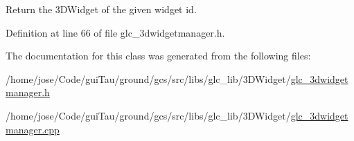 Return the 3\-D\-Widget of the given widget id. 



Definition at line 66 of file glc\-\_\-3dwidgetmanager.\-h.



The documentation for this class was generated from the following files\-:\begin{DoxyCompactItemize}
\item 
/home/jose/\-Code/gui\-Tau/ground/gcs/src/libs/glc\-\_\-lib/3\-D\-Widget/\hyperlink{glc__3dwidgetmanager_8h}{glc\-\_\-3dwidgetmanager.\-h}\item 
/home/jose/\-Code/gui\-Tau/ground/gcs/src/libs/glc\-\_\-lib/3\-D\-Widget/\hyperlink{glc__3dwidgetmanager_8cpp}{glc\-\_\-3dwidgetmanager.\-cpp}\end{DoxyCompactItemize}
